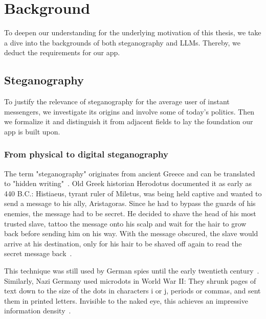 
\chapter{Background}\label{ch:background}
\glsresetall %

To deepen our understanding for the underlying motivation of this thesis, we take a dive into the backgrounds of both steganography and \glspl{LLM}. Thereby, we deduct the requirements for our app.

\section{Steganography}
\label{sec:steganography}
To justify the relevance of steganography for the average user of instant messengers, we investigate its origins and involve some of today's politics. Then we formalize it and distinguish it from adjacent fields to lay the foundation our app is built upon.

\subsection{From physical to digital steganography}
\label{sec:fromPhysicalToDigitalSteganography}
The term "steganography" originates from ancient Greece and can be translated to "hidden writing"~\cite{kolataVeiledMessagesTerror2001,dembartEndUserHide2001}. Old Greek historian Herodotus documented it as early as 440 B.C.: Histiaeus, tyrant ruler of Miletus, was being held captive and wanted to send a message to his ally, Aristagoras. Since he had to bypass the guards of his enemies, the message had to be secret. He decided to shave the head of his most trusted slave, tattoo the message onto his scalp and wait for the hair to grow back before sending him on his way. With the message obscured, the slave would arrive at his destination, only for his hair to be shaved off again to read the secret message back~\cite{bennettLinguisticSteganographySurvey2004,petitcolasInformationHidingSurvey1999,dembartEndUserHide2001}.

This technique was still used by German spies until the early twentieth century~\cite{petitcolasInformationHidingSurvey1999}. Similarly, Nazi Germany used microdots in World War II: They shrunk pages of text down to the size of the dots in characters i or j, periods or commas, and sent them in printed letters. Invisible to the naked eye, this achieves an impressive information density~\cite{dembartEndUserHide2001,petitcolasInformationHidingSurvey1999}.

